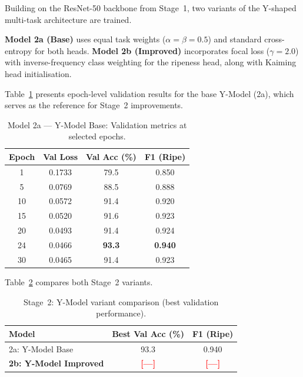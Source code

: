 \documentclass[10pt,twocolumn,letterpaper]{article}
\newcommand{\placeholder}[1]{\textcolor{red}{\textbf{[#1]}}}
\begin{document}
Building on the ResNet-50 backbone from Stage~1, two variants of the Y-shaped multi-task architecture are trained.

\textbf{Model 2a (Base)} uses equal task weights ($\alpha{=}\beta{=}0.5$) and standard cross-entropy for both heads.
\textbf{Model 2b (Improved)} incorporates focal loss ($\gamma{=}2.0$) with inverse-frequency class weighting for the ripeness head, along with Kaiming head initialisation.

Table~\ref{tab:stage2_epochs} presents epoch-level validation results for the base Y-Model (2a), which serves as the reference for Stage~2 improvements.

\begin{table}[H]
  \centering\small
  \caption{Model 2a — Y-Model Base: Validation metrics at selected epochs.}
  \label{tab:stage2_epochs}
  \begin{tabular}{cccc}
    \toprule
    \textbf{Epoch} & \textbf{Val Loss} & \textbf{Val Acc (\%)} & \textbf{F1 (Ripe)} \\
    \midrule
    1  & 0.1733 & 79.5 & 0.850 \\
    5  & 0.0769 & 88.5 & 0.888 \\
    10 & 0.0572 & 91.4 & 0.920 \\
    15 & 0.0520 & 91.6 & 0.923 \\
    20 & 0.0493 & 91.4 & 0.924 \\
    24 & 0.0466 & \textbf{93.3} & \textbf{0.940} \\
    30 & 0.0465 & 91.4 & 0.923 \\
    \bottomrule
  \end{tabular}
\end{table}

Table~\ref{tab:stage2_compare} compares both Stage~2 variants.

\begin{table}[H]
  \centering\small
  \caption{Stage~2: Y-Model variant comparison (best validation performance).}
  \label{tab:stage2_compare}
  \begin{tabular}{lcc}
    \toprule
    \textbf{Model} & \textbf{Best Val Acc (\%)} & \textbf{F1 (Ripe)} \\
    \midrule
    2a: Y-Model Base     & 93.3 & 0.940 \\
    \textbf{2b: Y-Model Improved} & \textbf{\placeholder{—}} & \textbf{\placeholder{—}} \\
    \bottomrule
  \end{tabular}
\end{table}
\end{document}
